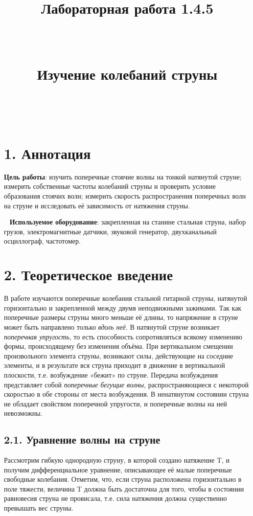 \documentclass[a4paper]{article}
\begin{document}
\title{\textbf{Лабораторная работа 1.4.5}

\

Изучение колебаний струны

\
}
\date{}
\maketitle
\section*{1. Аннотация}
\textbf{Цель работы}: изучить поперечные стоячие волны на тонкой натянутой струне; измерить собственные частоты колебаний струны и проверить условие образования стоячих волн; измерить скорость распространения поперечных волн на струне и исследовать её зависимость от натяжения струны.

\
\noindent
\textbf{Используемое оборудование}: закрепленная на станине стальная струна, набор грузов, электромагнитные датчики, звуковой генератор, двухканальный осциллограф, частотомер.

\section*{2. Теоретическое введение}
В работе изучаются поперечные колебания стальной гитарной струны, натянутой горизонтально и закрепленной между двумя неподвижными зажимами. Так как поперечные размеры струны много меньше её длины, то напряжение в струне может быть направлено только \textit{вдоль неё}. В натянутой струне возникает \textit{поперечная упругость}, то есть способность сопротивляться всякому изменению формы, происходящему без изменения объёма. При вертикальном смещении произвольного элемента струны, возникают силы, действующие на соседние элементы, и в результате вся струна приходит в движение в вертикальной плоскости, т.е. возбуждение «бежит» по струне. Передача возбуждения представляет собой \textit{поперечные бегущие волны}, распространяющиеся с некоторой скоростью в обе стороны от места возбуждения. В ненатянутом состоянии струна не обладает свойством поперечной упругости, и поперечные волны на ней невозможны.

\subsection*{2.1. Уравнение волны на струне}
Рассмотрим гибкую однородную струну, в которой создано натяжение T, и получим дифференциальное уравнение, описывающее её малые
поперечные свободные колебания. Отметим, что, если струна расположена
горизонтально в поле тяжести, величина T должна быть достаточна для
того, чтобы в состоянии равновесия струна не провисала, т.е. сила натяжения должна существенно превышать вес струны.
\end{document}
